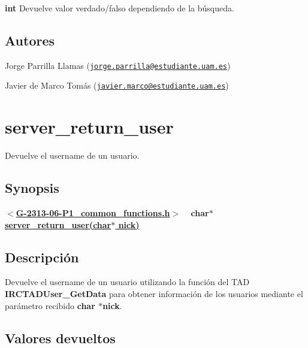 \begin{DoxyItemize}
\item {\bfseries int} Devuelve valor verdado/falso dependiendo de la búsqueda. 
\end{DoxyItemize}\hypertarget{server_channels_update_away_authors_server_channels_update_away}{}\subsection{Autores}\label{server_channels_update_away_authors_server_channels_update_away}

\begin{DoxyItemize}
\item Jorge Parrilla Llamas (\href{mailto:jorge.parrilla@estudiante.uam.es}{\tt jorge.\+parrilla@estudiante.\+uam.\+es}) 
\item Javier de Marco Tomás (\href{mailto:javier.marco@estudiante.uam.es}{\tt javier.\+marco@estudiante.\+uam.\+es}) 
\end{DoxyItemize}\hypertarget{server_return_user}{}\section{server\+\_\+return\+\_\+user}\label{server_return_user}
Devuelve el username de un usuario.\hypertarget{server_return_user_synopsis_server_return_user}{}\subsection{Synopsis}\label{server_return_user_synopsis_server_return_user}
{ {\bfseries $<$\hyperlink{G-2313-06-P1__common__functions_8h}{G-\/2313-\/06-\/\+P1\+\_\+common\+\_\+functions.\+h}$>$} ~\newline
 {\bfseries char$\ast$ \hyperlink{G-2313-06-P1__common__functions_8c_a230bf24ab7ae18d2e81ebc1d3575a6ad}{server\+\_\+return\+\_\+user(char$\ast$ nick)}} } \hypertarget{server_return_user_descripcion_server_return_user}{}\subsection{Descripción}\label{server_return_user_descripcion_server_return_user}
Devuelve el username de un usuario utilizando la función del T\+AD {\bfseries I\+R\+C\+T\+A\+D\+User\+\_\+\+Get\+Data} para obtener información de los usuarios mediante el parámetro recibido {\bfseries char $\ast$nick}. \hypertarget{server_return_user_return_server_return_user}{}\subsection{Valores devueltos}\label{server_return_user_return_server_return_user}

